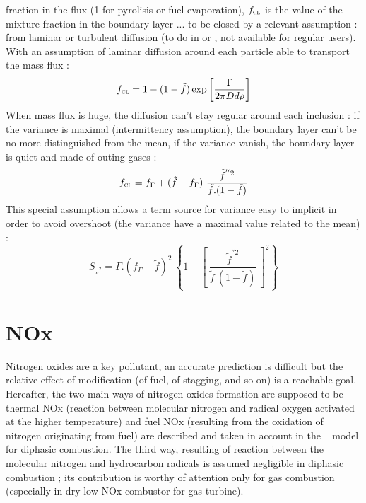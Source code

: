 fraction in the flux (1 for pyrolisis or fuel evaporation),
$f_{\mbox{\scriptsize\textsc{cl}}}$ is the value of the mixture fraction in the
boundary layer ... to be closed by a relevant assumption : from laminar or
turbulent diffusion (to do in  or
, not available for regular users).\\
With an assumption of laminar diffusion around each particle able to transport
the mass flux :
\begin{equation}
\displaystyle f_{\mbox{\scriptsize\textsc{cl}}} =  1 - (1-\tilde f)\exp \left[\displaystyle \frac{\Gamma}{2 \pi D d \rho}\right]
\end{equation} 
When mass flux is huge, the diffusion can't stay regular around each inclusion :
if the variance is maximal (intermittency assumption), the boundary layer can't
be no more distinguished from the mean, if the variance vanish, the boundary
layer is quiet and made of outing gases :
\begin{equation}
\displaystyle f_{\mbox{\scriptsize\textsc{cl}}} = f_{\Gamma} + (\tilde f  - f_{\Gamma}) ~ \frac{\widetilde f^{''2}}{\tilde f .(1-\tilde f)}
\end{equation} 
This special assumption allows a term source for variance easy to implicit in order to avoid overshoot (the variance have a maximal value related to the mean) :
\begin{equation}
\displaystyle S_{\widetilde ''^{2}} = \Gamma .\left( f_{\Gamma}-\tilde f\right)^{2} ~ \left\{ 1-\left[~ \frac{\widetilde f^{''2}}{\tilde f ~(1-\tilde f)}~\right]^{\textstyle2}\right\}
\end{equation}


\section*{NOx}

Nitrogen oxides are a key pollutant, an accurate prediction is difficult but the
relative effect of modification (of fuel, of stagging, and so on) is a reachable
goal.
Hereafter, the two main ways of nitrogen oxides formation are supposed to
be thermal NOx (reaction between molecular nitrogen and radical oxygen activated
at the higher temperature) and fuel NOx (resulting from the oxidation of
nitrogen originating from fuel) are described and taken in account in the \CS~
model for diphasic combustion. The third way, resulting of reaction between the
molecular nitrogen and hydrocarbon radicals is assumed negligible in diphasic
combustion ; its contribution is worthy of attention only for gas combustion
(especially in dry
low NOx combustor for gas turbine).\\

